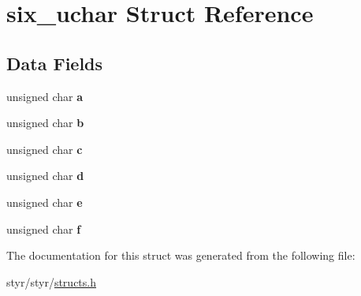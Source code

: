 \hypertarget{structsix__uchar}{}\section{six\+\_\+uchar Struct Reference}
\label{structsix__uchar}
\subsection*{Data Fields}
\begin{DoxyCompactItemize}
\item 
unsigned char {\bfseries a}\hypertarget{structsix__uchar_a24420a9beaac7cee08b5e255a4c29db1}{}\label{structsix__uchar_a24420a9beaac7cee08b5e255a4c29db1}

\item 
unsigned char {\bfseries b}\hypertarget{structsix__uchar_a41cede1b4c0d05cff170ad5761f70964}{}\label{structsix__uchar_a41cede1b4c0d05cff170ad5761f70964}

\item 
unsigned char {\bfseries c}\hypertarget{structsix__uchar_a089aacf63ed94ae0e667bb8f6db3e853}{}\label{structsix__uchar_a089aacf63ed94ae0e667bb8f6db3e853}

\item 
unsigned char {\bfseries d}\hypertarget{structsix__uchar_aef7bd9bb1f716afb151a4b4206d468f3}{}\label{structsix__uchar_aef7bd9bb1f716afb151a4b4206d468f3}

\item 
unsigned char {\bfseries e}\hypertarget{structsix__uchar_a78b0af8eb57f2f240016ee37529c6f47}{}\label{structsix__uchar_a78b0af8eb57f2f240016ee37529c6f47}

\item 
unsigned char {\bfseries f}\hypertarget{structsix__uchar_a7ceb8bf372a716e22ab056d1b7df49e7}{}\label{structsix__uchar_a7ceb8bf372a716e22ab056d1b7df49e7}

\end{DoxyCompactItemize}


The documentation for this struct was generated from the following file\+:\begin{DoxyCompactItemize}
\item 
styr/styr/\hyperlink{structs_8h}{structs.\+h}\end{DoxyCompactItemize}
